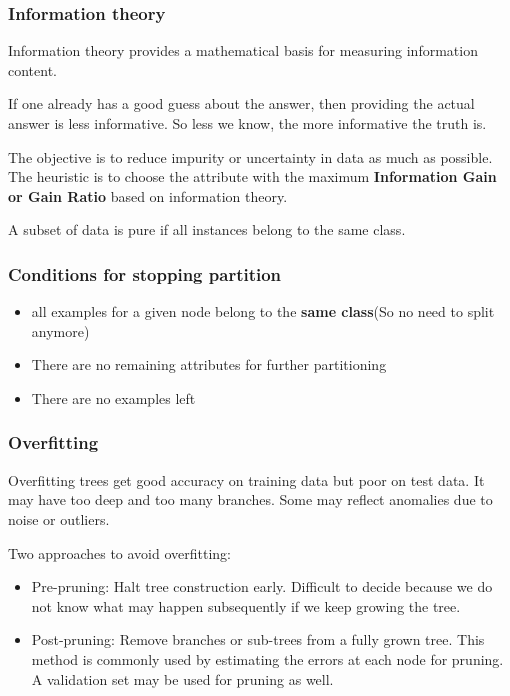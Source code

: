 \documentclass[letterpaper,12pt]{article}
\begin{document}
\subsubsection{Information theory}

Information theory provides a mathematical basis for measuring information
content.

If one already has a good guess about the answer, then providing the actual
answer is less informative. So less we know, the more informative the truth is.

The objective is to reduce impurity or uncertainty in data as much as possible.
The heuristic is to choose the attribute with the maximum \textbf{Information
    Gain or Gain Ratio} based on information theory.

A subset of data is pure if all instances belong to the same class.
\subsubsection{Conditions for stopping partition}
\begin{itemize}
    \item all examples for a given node belong to the \textbf{same class}(So no need to
          split anymore)
    \item There are no remaining attributes for further partitioning
    \item There are no examples left
\end{itemize}

\subsubsection{Overfitting}
Overfitting trees get good accuracy on training data but poor on test data. It may have too deep and too many branches. Some may reflect anomalies due to noise or outliers.

Two approaches to avoid overfitting:
\begin{itemize}
    \item Pre-pruning: Halt tree construction early. Difficult to decide because we do
          not know what may happen subsequently if we keep growing the tree.
    \item Post-pruning: Remove branches or sub-trees from a fully grown tree. This method
          is commonly used by estimating the errors at each node for pruning. A
          validation set may be used for pruning as well.
\end{itemize}
\end{document}
